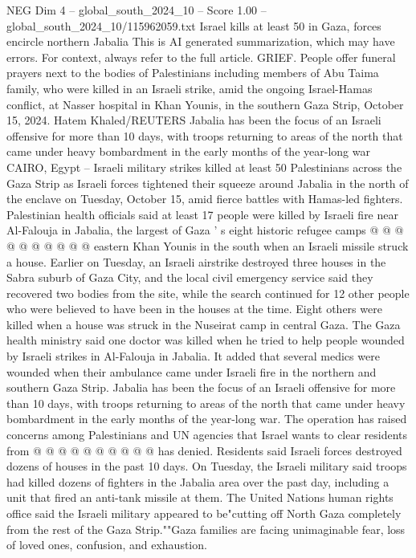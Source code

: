\begin{textsample}{NEG Dim 4 – global\_south\_2024\_10 – Score 1.00 – global\_south\_2024\_10/115962059.txt}  \label{ex:f4_neg_063}
Israel kills at least 50 in Gaza, forces encircle northern Jabalia This is AI generated summarization, which may have errors.
For context, always refer to the full article.
GRIEF.
People offer funeral prayers next to the bodies of Palestinians including members of Abu Taima family, who were killed in an Israeli strike, amid the ongoing Israel-Hamas conflict, at Nasser hospital in Khan Younis, in the southern Gaza Strip, October 15, 2024.
Hatem Khaled/REUTERS Jabalia has been the focus of an Israeli offensive for more than 10 days, with troops returning to areas of the north that came under heavy bombardment in the early months of the year-long war CAIRO, Egypt -- Israeli military strikes killed at least 50 Palestinians across the Gaza Strip as Israeli forces tightened their squeeze around Jabalia in the north of the enclave on Tuesday, October 15, amid fierce battles with Hamas-led fighters.
Palestinian health officials said at least 17 people were killed by Israeli fire near Al-Falouja in Jabalia, the largest of Gaza ' s eight historic refugee camps @ @ @ @ @ @ @ @ @ @ eastern Khan Younis in the south when an Israeli missile struck a house.
Earlier on Tuesday, an Israeli airstrike destroyed three houses in the Sabra suburb of Gaza City, and the local civil emergency service said they recovered two bodies from the site, while the search continued for 12 other people who were believed to have been in the houses at the time.
Eight others were killed when a house was struck in the Nuseirat camp in central Gaza.
The Gaza health ministry said one doctor was killed when he tried to help people wounded by Israeli strikes in Al-Falouja in Jabalia.
It added that several medics were wounded when their ambulance came under Israeli fire in the northern and southern Gaza Strip.
Jabalia has been the focus of an Israeli offensive for more than 10 days, with troops returning to areas of the north that came under heavy bombardment in the early months of the year-long war.
The operation has raised concerns among Palestinians and UN agencies that Israel wants to clear residents from @ @ @ @ @ @ @ @ @ @ has denied.
Residents said Israeli forces destroyed dozens of houses in the past 10 days.
On Tuesday, the Israeli military said troops had killed dozens of fighters in the Jabalia area over the past day, including a unit that fired an anti-tank missile at them.
The United Nations human rights office said the Israeli military appeared to be"cutting off North Gaza completely from the rest of the Gaza Strip.""Gaza families are facing unimaginable fear, loss of loved ones, confusion, and exhaustion.

\end{textsample}
